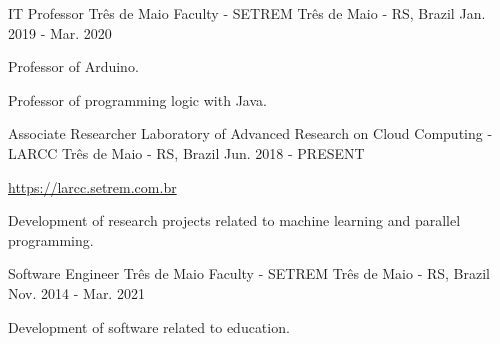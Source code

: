 
\begin{cventries}
	\cventry
	{IT Professor} %
	{Três de Maio Faculty - SETREM} %
	{Três de Maio - RS, Brazil} %
	{Jan. 2019 - Mar. 2020} %
	{
		\begin{cvitems} %
			\item {Professor of Arduino.}
			\item {Professor of programming logic with Java.}
		\end{cvitems}
	}

	\cventry
	{Associate Researcher} %
	{Laboratory of Advanced Research on Cloud Computing - LARCC} %
	{Três de Maio - RS, Brazil} %
	{Jun. 2018 - PRESENT} %
	{
		\begin{cvitems} %
			\item {\href{https://larcc.setrem.com.br}{https://larcc.setrem.com.br}}
			\item {Development of research projects related to machine learning and parallel programming.}
		\end{cvitems}
	}

	\cventry
	{Software Engineer} %
	{Três de Maio Faculty - SETREM} %
	{Três de Maio - RS, Brazil} %
	{Nov. 2014 - Mar. 2021} %
	{
		\begin{cvitems} %
			\item {Development of software related to education.}
		\end{cvitems}
	}
\end{cventries}
